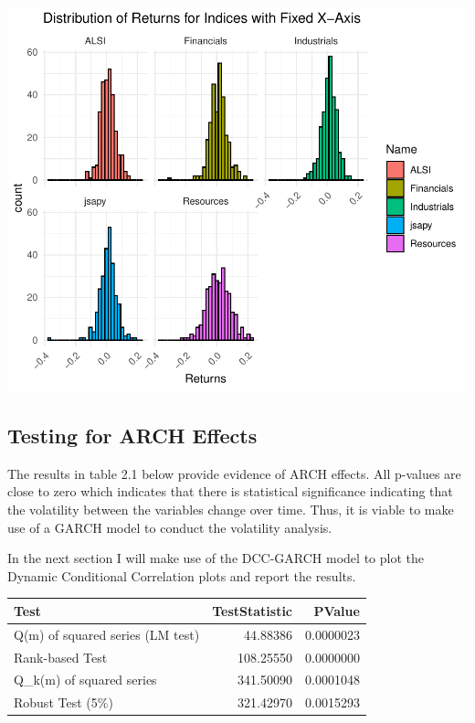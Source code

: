 \documentclass[12pt,preprint, authoryear]{elsarticle}
\let\origfigure\figure
\let\endorigfigure\endfigure
\renewenvironment{figure}[1][2] {
    \expandafter\origfigure\expandafter[H]
} {
    \endorigfigure
}
\let\origtable\table
\let\endorigtable\endtable
\renewenvironment{table}[1][2] {
    \expandafter\origtable\expandafter[H]
} {
    \endorigtable
}
\numberwithin{equation}{section}
\numberwithin{figure}{section}
\numberwithin{table}{section}
\begin{document}
\begin{figure}[H]

{\centering \includegraphics{DCC_GARCH_22582053_files/figure-latex/Figure2-1} 

}

\caption{Distribution of Returns \label{Figure2}}\label{fig:Figure2}
\end{figure}

\hypertarget{testing-for-arch-effects}{%
\subsection{Testing for ARCH Effects}\label{testing-for-arch-effects}}

The results in table 2.1 below provide evidence of ARCH effects. All
p-values are close to zero which indicates that there is statistical
significance indicating that the volatility between the variables change
over time. Thus, it is viable to make use of a GARCH model to conduct
the volatility analysis.

In the next section I will make use of the DCC-GARCH model to plot the
Dynamic Conditional Correlation plots and report the results.

\begin{table}

\caption{\label{tab:unnamed-chunk-12}McLeod-Li Test Results for Autoregressive Conditional Heteroskedasticity}
\centering
\begin{tabular}[t]{lrr}
\toprule
Test & TestStatistic & PValue\\
\midrule
Q(m) of squared series (LM test) & 44.88386 & 0.0000023\\
Rank-based Test & 108.25550 & 0.0000000\\
Q\_k(m) of squared series & 341.50090 & 0.0001048\\
Robust Test (5\%) & 321.42970 & 0.0015293\\
\bottomrule
\end{tabular}
\end{table}
\end{document}

